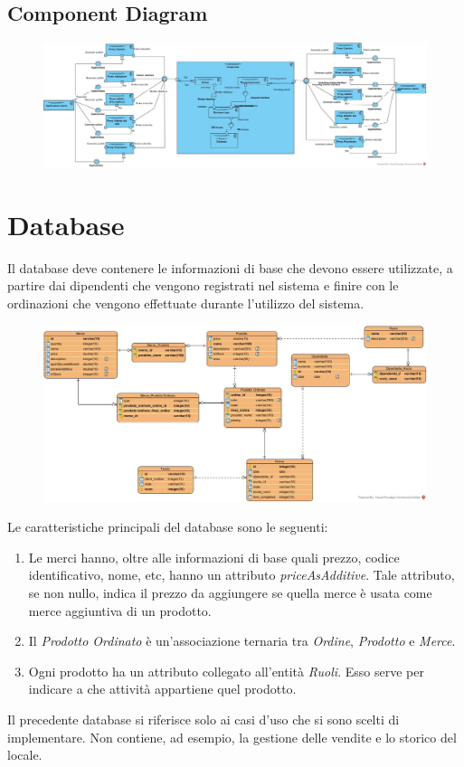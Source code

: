 \subsection{Component Diagram}
\begin{figure}[H]
	\centering
	\includegraphics[width=1\textwidth]{Immagini/dynamic components.jpg}
\end{figure}

\section{Database}
Il database deve contenere le informazioni di base che devono essere utilizzate, a partire dai dipendenti che vengono registrati nel sistema e finire con le ordinazioni che vengono effettuate durante l'utilizzo del sistema.
\begin{figure}[H]
	\centering
	\includegraphics[width=1\textwidth]{Immagini/database.jpg}
\end{figure}
Le caratteristiche principali del database sono le seguenti:
\begin{enumerate}
	\item Le merci hanno, oltre alle informazioni di base quali prezzo, codice identificativo, nome, etc, hanno un attributo \textit{priceAsAdditive}. Tale attributo, se non nullo, indica il prezzo da aggiungere se quella merce è usata come merce aggiuntiva di un prodotto.
	\item Il \textit{Prodotto Ordinato} è un'associazione ternaria tra \textit{Ordine}, \textit{Prodotto} e \textit{Merce}.
	 \item Ogni prodotto ha un attributo collegato all'entità \textit{Ruoli}. Esso serve per indicare a che attività appartiene quel prodotto.
\end{enumerate}
Il precedente database si riferisce solo ai casi d'uso che si sono scelti di implementare. Non contiene, ad esempio, la gestione delle vendite e lo storico del locale.

